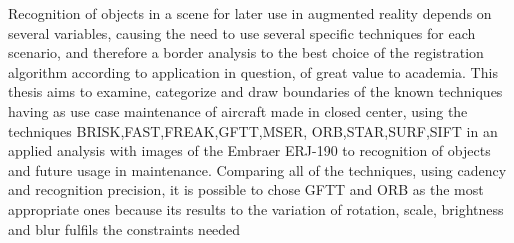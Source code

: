 Recognition of objects in a scene for later use in augmented reality depends on several variables, causing the need 
to use several specific techniques for each scenario, and therefore a border
analysis to the best choice of the registration algorithm according to
application in question, of great value to academia.
This thesis aims to examine, categorize and draw boundaries of the known techniques having as use case maintenance of 
aircraft made in closed center, using the techniques BRISK,FAST,FREAK,GFTT,MSER,
ORB,STAR,SURF,SIFT in an applied analysis with images of the Embraer ERJ-190 to recognition of objects and future usage in maintenance. Comparing all of the techniques, using cadency and recognition precision, it is possible to chose GFTT and ORB as the most appropriate ones because its results to the variation of
rotation, scale, brightness and blur fulfils the constraints needed
